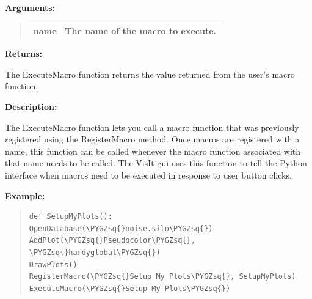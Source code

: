 \documentclass[letterpaper,10pt,english]{sphinxmanual}
\def\PYGZsq{\char`\'}
\renewcommand\PYGZsq{\textquotesingle}
\begin{document}
\begin{DUlineblock}{0em}
\item[] 
\item[] \textbf{Arguments:}
\end{DUlineblock}
\begin{quote}

\begin{tabulary}{\linewidth}{|L|L|}
\hline

name
 & 
The name of the macro to execute.
\\
\hline\end{tabulary}

\end{quote}

\begin{DUlineblock}{0em}
\item[] 
\item[] \textbf{Returns:}
\item[] The ExecuteMacro function returns the value returned from the user's macro function.
\item[] 
\item[] \textbf{Description:}
\item[] The ExecuteMacro function lets you call a macro function that was previously
registered using the RegisterMacro method. Once macros are registered with a
name, this function can be called whenever the macro function associated with
that name needs to be called. The VisIt gui uses this function to tell the
Python interface when macros need to be executed in response to user button
clicks.
\end{DUlineblock}

\begin{DUlineblock}{0em}
\item[] 
\end{DUlineblock}

\begin{DUlineblock}{0em}
\item[] \textbf{Example:}
\item[] 
\end{DUlineblock}
\begin{quote}

\begin{Verbatim}[commandchars=\\\{\}]
def SetupMyPlots():
OpenDatabase(\PYGZsq{}noise.silo\PYGZsq{})
AddPlot(\PYGZsq{}Pseudocolor\PYGZsq{}, \PYGZsq{}hardyglobal\PYGZsq{})
DrawPlots()
RegisterMacro(\PYGZsq{}Setup My Plots\PYGZsq{}, SetupMyPlots)
ExecuteMacro(\PYGZsq{}Setup My Plots\PYGZsq{})
\end{Verbatim}
\end{quote}
\end{document}
